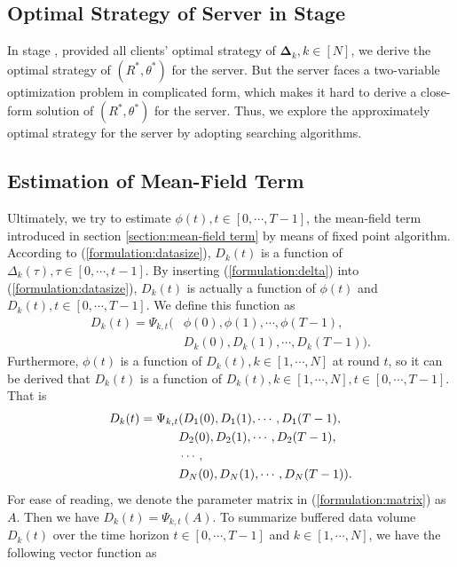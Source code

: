 \documentclass{article}
\theoremstyle{plain}
\theoremstyle{definition}
\theoremstyle{remark}
\begin{document}
\subsection{Optimal Strategy of Server in Stage \uppercase\expandafter{}}
In stage \uppercase\expandafter{}, provided all clients' optimal strategy of $\boldsymbol{\Delta}_k, k \in [N]$, we derive the optimal strategy of $(R^*, \theta^*)$ for the server.
But the server faces a two-variable optimization problem in complicated form, which makes it hard to derive a close-form solution of $(R^*, \theta^*)$ for the server.
Thus, we explore the approximately optimal strategy for the server by adopting searching algorithms.

\subsection{Estimation of Mean-Field Term}
\label{section:estimation}
Ultimately, we try to estimate $\phi(t), t\in[0,\cdots,T-1]$, the mean-field term introduced in section \ref{section:mean-field term} by means of fixed point algorithm.
According to (\ref{formulation:datasize}), $D_k(t)$ is a function of $\Delta_k(\tau), \tau \in [0,\cdots,t-1]$. By inserting (\ref{formulation:delta}) into (\ref{formulation:datasize}), $D_k(t)$ is actually a function of $\phi(t)$ and $D_k(t), t \in [0, \cdots, T-1]$.
We define this function as
\begin{align}
  D_k(t) = \Psi_{k,t}( & \phi(0), \phi(1), \cdots, \phi(T-1), \\
                       & D_k(0), D_k(1), \cdots, D_k(T-1)).
\end{align}
Furthermore, $\phi(t)$ is a function of $D_k(t), k \in [1, \cdots, N]$ at round $t$, so it can be derived that $D_k(t)$ is a function of $D_k(t), k \in [1, \cdots, N], t \in [0, \cdots, T-1]$. That is
\begin{align}
  \label{formulation:matrix}
  D_k(t) = \Psi_{k,t} & (D_1(0), D_1(1), \cdots, D_1(T-1), \notag \\
                      & D_2(0), D_2(1), \cdots, D_2(T-1), \notag \\
                      & \cdots, \notag \\
                      & D_N(0), D_N(1), \cdots, D_N(T-1)).
\end{align}
For ease of reading, we denote the parameter matrix in (\ref{formulation:matrix}) as $A$. Then we have $D_k(t) = \Psi_{k,t}(A)$.
To summarize buffered data volume $D_k(t)$ over the time horizon $t \in [0, \cdots, T-1]$ and $k \in [1, \cdots, N]$, we have the following vector function as
\end{document}
